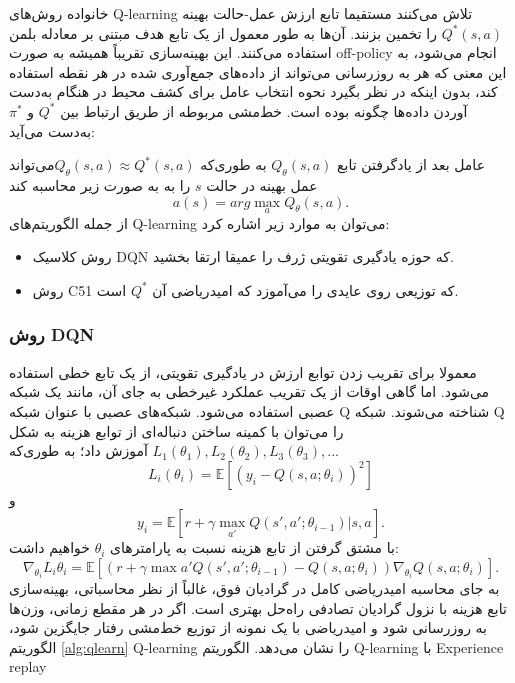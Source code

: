 خانواده روش‌های  Q-learning تلاش می‌کنند مستقیما تابع ارزش عمل-حالت بهینه $Q^*(s,a)$ را تخمین بزنند. آن‌ها به طور معمول از یک تابع هدف مبتنی بر معادله بلمن استفاده می‌کنند. این بهینه‌سازی تقریباً همیشه به صورت off-policy انجام می‌شود، به این معنی که هر به روزرسانی می‌تواند از داده‌های جمع‌آوری شده در هر نقطه استفاده کند، بدون اینکه در نظر بگیرد نحوه انتخاب عامل برای کشف محیط در هنگام به‌دست آوردن داده‌ها چگونه بوده است. خط‌مشی مربوطه از طریق ارتباط بین 
$Q^*$
و
$\pi^*$
 به‌دست می‌آید: 
 
 عامل بعد از یادگرفتن تابع $Q_\theta(s,a)$ به طوری‌که  $Q_\theta(s,a) \approx Q^*(s,a)$می‌تواند عمل بهینه در حالت $s$ را به به صورت زیر محاسبه کند $$a(s) = arg \max_a Q_{\theta}(s,a).$$
از جمله الگوریتم‌های Q-learning می‌توان به موارد زیر اشاره کرد:
\begin{itemize}
\item روش کلاسیک DQN که حوزه یادگیری تقویتی ژرف را عمیقا ارتقا بخشید.
\item روش C51 که توزیعی روی عایدی را می‌آموزد که امیدریاضی آن $Q^*$ است.
\end{itemize}
\subsubsection{روش DQN}
معمولا برای تقریب زدن توابع ارزش در یادگیری تقویتی، از یک تابع خطی استفاده می‌شود.
اما گاهی اوقات از یک تقریب عملکرد غیرخطی به جای آن، مانند یک شبکه عصبی استفاده می‌شود. شبکه‌های عصبی با عنوان شبکه Q شناخته می‌شوند.
شبکه Q را می‌توان با کمینه ساختن دنباله‌ای از توابع هزینه به شکل 
$L_1(\theta_1), L_2(\theta_2), L_3(\theta_3), ... $ آموزش داد؛ به طوری‌که
$$L_i(\theta_i)=\mathbb{E}\left[(y_i - Q(s,a;\theta_i))^2\right]$$  و  $$y_i = \mathbb{E}[r + \gamma \max_{a'} Q(s',a'; \theta_{i-1})| s,a].$$ با مشتق گرفتن از تابع هزینه نسبت به پارامترهای $\theta_i$  خواهیم داشت: $$\nabla_{\theta_i} L_i{\theta_i} = \mathbb{E}\left[ \left(r + \gamma \max{a'} Q(s',a';\theta_{i-1}) - Q(s,a;\theta_i)\right) \nabla_{\theta_i} Q(s,a;\theta_i)\right].$$
به جای محاسبه امیدریاضی کامل در گرادیان فوق، غالباً از نظر محاسباتی، بهینه‌سازی تابع هزینه با نزول گرادیان تصادفی   راه‌حل بهتری است. اگر در هر مقطع زمانی، وزن‌ها به روزرسانی شود و امیدریاضی با یک نمونه از توزیع خط‌مشی رفتار  جایگزین شود، الگوریتم
\ref{alg:qlearn}
 Q-learning را نشان می‌دهد.
{الگوریتم Q-learning با Experience replay}


